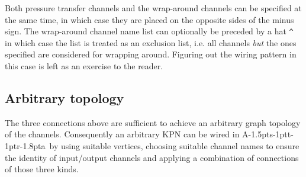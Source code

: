 \documentclass[11pt]{report}
\def\ak{{\textsf{A\kern-1.5pts\kern-1ptt\kern-1ptr\kern-1.8pta}}\kern-2pt{\it K\kern-2ptahn}}
\begin{document}
Both pressure transfer channels and the wrap-around channels can be specified at the same time, in which case they are placed on the opposite sides of the minus sign. The wrap-around channel name list can optionally be preceded by a hat \verb$^$ in which case the list is treated as an exclusion list, i.e. all channels {\em but} the ones specified are considered for wrapping around. Figuring out the wiring pattern in this case is left as an exercise to the reader.

\subsection{Arbitrary topology}

The three connections above are sufficient to achieve an arbitrary graph topology of the channels. Consequently an arbitrary KPN can be wired in \ak\ by using suitable vertices, choosing suitable channel names to ensure the identity of input/output channels and applying a combination of connections of those three kinds.
\end{document}

